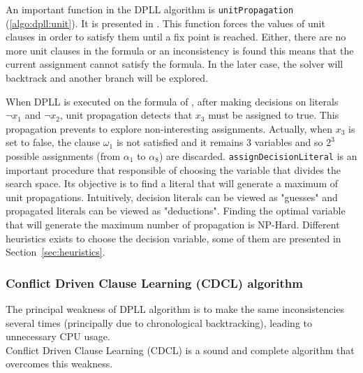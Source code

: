 

An important function in the DPLL algorithm is \texttt{unitPropagation} (\cref{algo:dpll:unit}).
It is presented in . This function forces the values of unit clauses in order to satisfy them
until a fix point is reached. Either, there
 are no more unit clauses in the formula or an inconsistency 
is found this means that the current assignment cannot satisfy the formula. In the later case, the solver will
backtrack and another branch will be explored.

When DPLL  is executed on the formula of , after making decisions on literals
$\neg x_1$ and $\neg x_2$, unit propagation detects that $x_3$ must be assigned to true.
This propagation prevents to explore non-interesting assignments. Actually, when $x_3$ is set to false,
the clause $\omega_1$ is not satisfied and it remains 3 variables and so $2^3$ possible assignments
(from $\alpha_1$ to $\alpha_8$) are discarded.
\texttt{assignDecisionLiteral} is an important procedure that responsible of choosing the variable that
divides the search space. Its objective is to find a literal that will generate a maximum of unit propagations. Intuitively, decision literals can be viewed as "guesses" and propagated literals can be viewed as "deductions". 
Finding the optimal variable that will generate the maximum number of propagation is NP-Hard\cite{biere2009handbook}.
 Different heuristics exists to choose the decision variable,
some of them are presented in Section~\ref{sec:heuristics}.
%
%
\subsubsection{Conflict Driven Clause Learning (CDCL) algorithm}\label{sec:cdcl}
The principal weakness of DPLL algorithm is to make the same inconsistencies several times
(principally due to chronological backtracking), leading to  unnecessary CPU usage.\\
Conflict Driven Clause Learning (CDCL) \cite{marques1999grasp} is a sound and complete algorithm
that overcomes this weakness.

